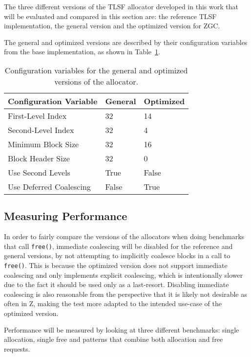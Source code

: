 The three different versions of the TLSF allocator developed in this work that will be evaluated and compared in this section are: the reference TLSF implementation, the general version and the optimized version for ZGC. 

The general and optimized versions are described by their configuration variables from the base implementation, as shown in Table~\ref{table:configuration-variables}.

\begin{table}[H]
    \centering
    \begin{tabular}{lp{2cm}p{6.9cm}}
    \textbf{{Configuration Variable}} & \textbf{{General}} & \textbf{{Optimized}} \\ \hline
    First-Level Index         & 32       & 14     \\ \hline
    Second-Level Index        & 32       & 4      \\ \hline
    Minimum Block Size        & 32       & 16     \\ \hline
    Block Header Size         & 32       & 0      \\ \hline
    Use Second Levels         & True     & False  \\ \hline
    Use Deferred Coalescing   & False    & True
    \end{tabular}
    \caption{Configuration variables for the general and optimized versions of the allocator.}
    \label{table:configuration-variables}
\end{table}

\subsection{Measuring Performance}

In order to fairly compare the versions of the allocators when doing benchmarks that call \texttt{free()}, immediate coalescing will be disabled for the reference and general versions, by not attempting to implicitly coalesce blocks in a call to \texttt{free()}. This is because the optimized version does not support immediate coalescing and only implements explicit coalescing, which is intentionally slower due to the fact it should be used only as a last-resort. Disabling immediate coalescing is also reasonable from the perspective that it is likely not desirable as often in Z, making the test more adapted to the intended use-case of the optimized version.

Performance will be measured by looking at three different benchmarks: single allocation, single free and patterns that combine both allocation and free requests.

